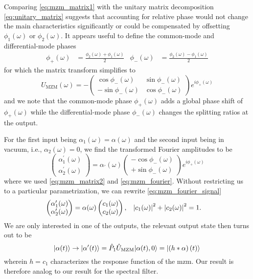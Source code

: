 Comparing \cref{eq:mzm_matrix1} with the unitary matrix decomposition \cref{eq:unitary_matrix} suggests that accounting for relative phase would not change the main characteristics significantly or could be compensated by offsetting $\phi_1(\omega)$ or $\phi_2(\omega)$.
It appears useful to define the common-mode and differential-mode phases
\begin{align}
	\phi_+(\omega)
	&=
	\frac{\phi_2(\omega)+\phi_1(\omega)}{2}
	&
	\phi_-(\omega)
	&=
	\frac{\phi_2(\omega)-\phi_1(\omega)}{2}
\end{align}
for which the matrix transform simplifies to
\begin{equation}
	U_\text{MZM}(\omega)
	=
	-
	\begin{pmatrix}
		\cos\phi_-(\omega) & \sin\phi_-(\omega) \\
		-\sin\phi_-(\omega) & \cos\phi_-(\omega)
	\end{pmatrix}
	e^{i\phi_+(\omega)}
	\label{eq:mzm_matrix2}
\end{equation}
and we note that the common-mode phase $\phi_+(\omega)$ adds a global phase shift of $\phi_+(\omega)$ while the differential-mode phase $\phi_-(\omega)$ changes the splitting ratios at the output.

For the first input being $\alpha_1(\omega)=\alpha(\omega)$ and the second input being in vacuum, i.e., $\alpha_2(\omega)=0$, we find the transformed Fourier amplitudes to be
\begin{equation}
	\begin{pmatrix}
		\alpha_1^\prime(\omega) \\
		\alpha_2^\prime(\omega)
	\end{pmatrix}
	=
	\alpha_\prime(\omega)
	\begin{pmatrix}
		-\cos\phi_-(\omega) \\
		+\sin\phi_-(\omega)
	\end{pmatrix}
	e^{i\phi_+(\omega)}
	\label{eq:mzm_fourier_signal}
\end{equation}
where we used \cref{eq:mzm_matrix2} and \cref{eq:mzm_fourier}.
Without restricting us to a particular parametrization, we can rewrite \cref{eq:mzm_fourier_signal}
\begin{align}
	\begin{pmatrix}
		\alpha_1^\prime(\omega) \\
		\alpha_2^\prime(\omega)
	\end{pmatrix}
	&=
	\alpha(\omega)
	\begin{pmatrix}
		c_1(\omega) \\
		c_2(\omega)
	\end{pmatrix}
	,
	&
	\abs*{c_1(\omega)}^2
	+
	\abs*{c_2(\omega)}^2
	&=
	1
	.
\end{align}
We are only interested in one of the outputs, the relevant output state then turns out to be
\begin{equation}
	\ket{\alpha(t)}
	\to
	\ket*{\alpha^\prime(t)}
	=
	\hat{P}_1
	\hat{U}_\text{MZM}
	\ket*{\alpha(t),0}
	=
	\ket*{\left(h*\alpha\right)(t)}
	\label{eq:mzm_state}
\end{equation}
wherein $h=c_1$ characterizes the response function of the \gls{mzm}.
Our result is therefore analog to our result for the spectral filter.

